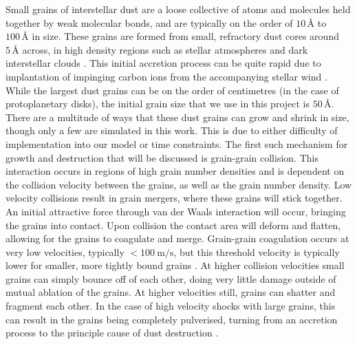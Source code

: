 Small grains of interstellar dust are a loose collective of atoms and molecules held together by weak molecular bonds, and are typically on the order of $10 \, \si{\angstrom}$ to $100 \, \si{\angstrom}$ in size.
These grains are formed from small, refractory dust cores around $5\,\si{\angstrom}$ across, in high density regions such as stellar atmospheres and dark interstellar clouds \parencite{spitzerPhysicalProcessesInterstellar2008}.
This initial accretion process can be quite rapid due to implantation of impinging carbon ions from the accompanying stellar wind \parencite{zubkoPhysicalModelDust1998a}.
While the largest dust grains can be on the order of centimetres (in the case of protoplanetary disks), the initial grain size that we use in this project is $50 \, \si{\angstrom}$.
There are a multitude of ways that these dust grains can grow and shrink in size, though only a few are simulated in this work.
This is due to either difficulty of implementation into our model or time constraints.
The first such mechanism for growth and destruction that will be discussed is grain-grain collision.
This interaction occurs in regions of high grain number densities and is dependent on the collision velocity between the grains, as well as the grain number density.
Low velocity collisions result in grain mergers, where these grains will stick together.
An initial attractive force through van der Waals interaction will occur, bringing the grains into contact.
Upon collision the contact area will deform and flatten, allowing for the grains to coagulate and merge.
Grain-grain coagulation occurs at very low velocities, typically $<\SI{100}{\metre\per\second}$, but this threshold velocity is typically lower for smaller, more tightly bound grains
\parencite{chokshiDustCoagulation1993}.
At higher collision velocities small grains can simply bounce off of each other, doing very little damage outside of mutual ablation of the grains.
At higher velocities still, grains can shatter and fragment each other.
In the case of high velocity shocks with large grains, this can result in the grains being completely pulverised, turning from an accretion process to the principle cause of dust destruction
\parencite{jonesGrainShatteringShocks1996,jonesDustDestructionProcesses2004}.

